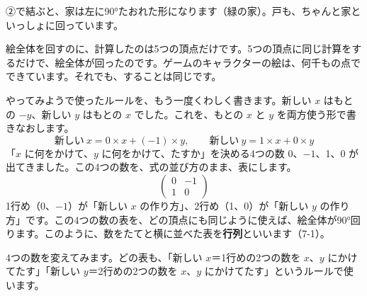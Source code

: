 \noindent\begin{minipage}[c]{0.52\linewidth}\raggedright
②で結ぶと、家は左に90°たおれた形になります（緑の家）。戸も、ちゃんと家といっしょに回っています。\par\vspace{3pt}
絵全体を回すのに、計算したのは5つの頂点だけです。5つの頂点に同じ計算をするだけで、絵全体が回ったのです。ゲームのキャラクターの絵は、何千もの点でできています。それでも、することは同じです。
\end{minipage}\hfill
\begin{minipage}[c]{0.44\linewidth}\centering
{}
\end{minipage}



\label{bk:7-0:yotsu}やってみようで使ったルールを、もう一度くわしく書きます。新しい $x$ はもとの $-y$、新しい $y$ はもとの $x$ でした。これを、もとの $x$ と $y$ を両方使う形で書きなおします。
\[ \text{新しい}\ x=0\times x+(-1)\times y,\qquad \text{新しい}\ y=1\times x+0\times y \]
「$x$ に何をかけて、$y$ に何をかけて、たすか」を決める4つの数 0、$-1$、1、0 が出てきました。この4つの数を、式の並び方のまま、表にします。
\[ \begin{pmatrix} 0 & -1\\ 1 & 0 \end{pmatrix} \]
1行め（0、$-1$）が「新しい $x$ の作り方」、2行め（1、0）が「新しい $y$ の作り方」です。この4つの数の表を、どの頂点にも同じように使えば、絵全体が90°回ります。このように、数をたてと横に並べた表を\textbf{行列}といいます（7-1）。


\label{bk:7-0:kawaru}4つの数を変えてみます。どの表も、「新しい $x$＝1行めの2つの数を $x$、$y$ にかけてたす」「新しい $y$＝2行めの2つの数を $x$、$y$ にかけてたす」というルールで使います。

